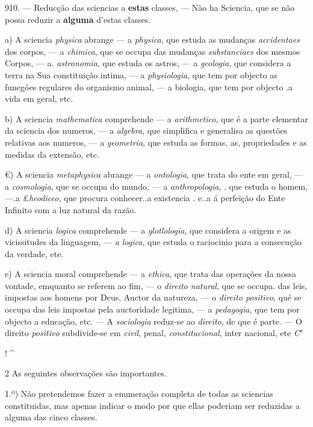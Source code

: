 910. --- Reducção das sciencias a \textbf{estas} classes, --- Nào ha Sciencia, que se não possa reduzir a \textbf{alguma} d'estas classes.

a) A sciencia \emph{physica} abrange --- a \emph{physica}, que estuda as mudanças \emph{accidentaes} dos corpos, --- a \emph{chimica}, que se occupa das mudanças \emph{substanciaes} dos mesmos Corpos, --- a. \emph{astronomia}, que estuda os astros, --- a \emph{geologia}, que considera a terra na   Sua constituição intima, --- a \emph{physiologia}, que tem por objecto as funegóes regulares do organismo animal, --- a biologia, que tem por objecto .a vida em geral, etc.

b) A sciencia \emph{mathematica} comprehende --- a \emph{arithmetico}, que é a parte elementar da sciencia dos numeros, --- a \emph{algebra}, que simplifica e generalisa as questões relativas aos numeros, --- a \emph{geometria}, que estuda as formas, as, propriedades e as medidas da extensão, etc.

€) A sciencia \emph{metaphysica} abrange --- a \emph{ontologia}, que trata do ente em geral, --- a \emph{cosmologia}, que se occupa do mundo, --- a \emph{anthropologia}, . que estuda o homem, ---.a £\emph{heodiceo}, que procura conhecer..a existencia . e..a á perfeição do Ente Infinito com a luz natural da razão.

d) A sciencia \emph{logica} comprehende --- a \emph{glotlologia}, que considera a origem e as vicissitudes da linguagem, --- \emph{a logica}, que estuda o raciocinio para a consecução da verdade, ete.

e) A sciencia moral comprehende --- a \emph{ethica}, que trata das operações da nossa vontade, emquanto se referem ao fim, --- o \emph{direito natural}, que se occupa. das leis, impostas aos homens por Deus, Auctor da natureza, --- o \emph{direito positivo}, qué se occupa das leis impostas pela auctoridade legitima, --- a \emph{pedagogia}, que tem por objecto a educação, etc. --- A \emph{sociologia} reduz-se ao \emph{direito}, de que é parte. --- O direito \emph{positivo} subdivide-se em \emph{civil}, penal, \emph{constitucional}, inter nacional, ete \emph{C}"

! \textasciicircum{}

2 As seguintes observações são importantes.

1.º) Não pretendemos fazer a enumeração completa de todas as sciencias constituidas, mas apenas indicar o modo por que ellas poderiam ser reduzidas a alguma das cinco classes.

